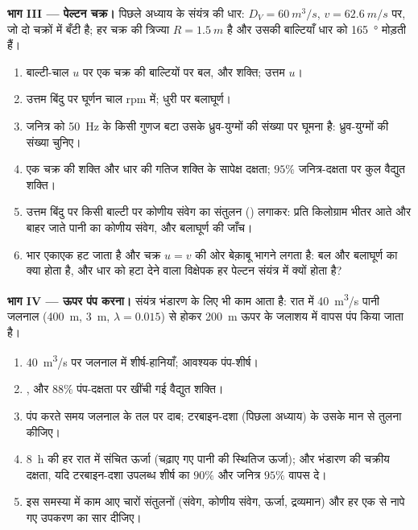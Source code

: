 \begin{problem}
\medskip
\noindent\textbf{भाग III --- पेल्टन चक्र।}
पिछले अध्याय के संयंत्र की धार: $D_V = \qty{60}{m^3/s}$, $v =
\qty{62.6}{m/s}$ पर, जो दो चक्रों में बँटी है; हर चक्र की त्रिज्या $R =
\qty{1.5}{m}$ है और उसकी बाल्टियाँ धार को \qty{165}{\degree} मोड़ती हैं।
\begin{enumerate}[resume]
  \item बाल्टी-चाल $u$ पर एक चक्र की बाल्टियों पर बल, और
        शक्ति; उत्तम $u$।
  \item उत्तम बिंदु पर घूर्णन चाल \unit{rpm} में; धुरी पर बलाघूर्ण।
  \item जनित्र को \qty{50}{Hz} के किसी गुणज बटा उसके ध्रुव-युग्मों की
        संख्या पर घूमना है: ध्रुव-युग्मों की संख्या चुनिए।
  \item एक चक्र की शक्ति और धार की गतिज शक्ति के सापेक्ष
        दक्षता; $95\%$ जनित्र-दक्षता पर कुल वैद्युत शक्ति।
  \item उत्तम बिंदु पर किसी बाल्टी पर कोणीय संवेग का संतुलन () लगाकर: प्रति किलोग्राम भीतर आते और बाहर जाते
        पानी का कोणीय संवेग, और बलाघूर्ण की जाँच।
  \item भार एकाएक हट जाता है और चक्र $u =
        v$ की ओर बेक़ाबू भागने लगता है: बल और बलाघूर्ण का क्या होता है, और
        धार को हटा देने वाला विक्षेपक हर पेल्टन संयंत्र में क्यों होता है?
\end{enumerate}

\medskip
\noindent\textbf{भाग IV --- ऊपर पंप करना।}
संयंत्र भंडारण के लिए भी काम आता है: रात में \qty{40}{m^3/s} पानी
जलनाल (\qty{400}{m}, \qty{3}{m}, $\lambda = 0.015$) से होकर \qty{200}{m} ऊपर के
जलाशय में वापस पंप किया जाता है।
\begin{enumerate}[resume]
  \item \qty{40}{m^3/s} पर जलनाल में शीर्ष-हानियाँ; आवश्यक पंप-शीर्ष।
  \item {}, और $88\%$ पंप-दक्षता पर खींची गई
        वैद्युत शक्ति।
  \item पंप करते समय जलनाल के तल पर दाब; टरबाइन-दशा (पिछला अध्याय)
        के उसके मान से तुलना कीजिए।
  \item \qty{8}{h} की हर रात में संचित ऊर्जा (चढ़ाए गए पानी की
        स्थितिज ऊर्जा); और भंडारण की चक्रीय दक्षता, यदि
        टरबाइन-दशा उपलब्ध शीर्ष का $90\%$ और जनित्र $95\%$ वापस दे।
  \item इस समस्या में काम आए चारों संतुलनों (संवेग, कोणीय
        संवेग, ऊर्जा, द्रव्यमान) और हर एक से नापे गए उपकरण का सार दीजिए।
\end{enumerate}
\end{problem}
